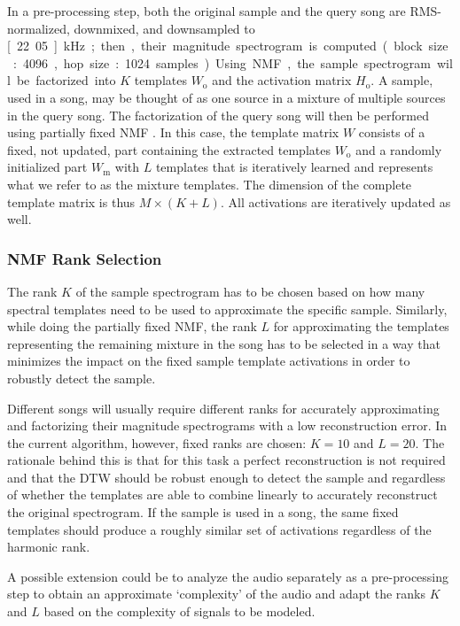 \documentclass{article}
\begin{document}
In a pre-processing step, both the original sample and the query song are RMS-normalized, downmixed, and downsampled to \unit[22.05]{kHz}; then, their magnitude spectrogram is computed (block size: 4096, hop size: 1024 samples). %
Using NMF, the sample spectrogram will be factorized into $K$ templates $W_\mathrm{o}$ and the activation matrix $H_\mathrm{o}$. A sample, used in a song, may be thought of as one source in a mixture of multiple sources in the query song. 
The factorization of the query song will then be performed using partially fixed NMF \cite{wu_drum_2015,wu2015drum}. In this case, the template matrix $W$ consists of a fixed, not updated, part containing the extracted templates $W_\mathrm{o}$ and a randomly initialized part $W_\mathrm{m}$ with $L$ templates that is iteratively learned and represents what we refer to as the mixture templates. The dimension of the complete template matrix is thus $M\times (K+L)$. All activations are iteratively updated as well.

\subsubsection{NMF Rank Selection}
\label{nmfrank}
The rank $K$ of the sample spectrogram has to be chosen based on how many spectral templates need to be used to approximate the specific sample. Similarly, while doing the partially fixed NMF, the rank $L$ for approximating the templates representing the remaining mixture in the song has to be selected in a way that minimizes the impact on the fixed sample template activations in order to robustly detect the sample.

Different songs will usually require different ranks for accurately approximating and factorizing their magnitude spectrograms with a low reconstruction error. In the current algorithm, however, fixed ranks are chosen: $K=10$ and $L=20$. The rationale behind this is that for this task a perfect reconstruction is not required and that the DTW should be robust enough to detect the sample and regardless of whether the templates are able to combine linearly to accurately reconstruct the original spectrogram. If the sample is used in a song, the same fixed templates should produce a roughly similar set of activations regardless of the harmonic rank. 

A possible extension could be to analyze the audio separately as a pre-processing step to obtain an approximate `complexity' of the audio and adapt the ranks $K$ and $L$ based on the complexity of signals to be modeled. 
\end{document}
